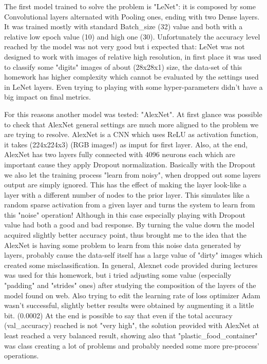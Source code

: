 \documentclass[11pt]{scrartcl}
\begin{document}
{{{\vspace{0.3cm}

\noindent
The first model trained to solve the problem is "LeNet": it is composed by some Convolutional layers alternated with Pooling ones, ending with two Dense layers.
It was trained mostly with standard Batch\_size (32) value and both with a relative low epoch value (10) and high one (30). \newline
Unfortunately the accuracy level reached by the model was not very good but i expected that: LeNet was not designed to work with images of relative high resolution, in first place it was used to classify some "digits" images of about (28x28x1) size, the data-set of this homework has higher complexity which cannot be evaluated by the settings used in LeNet layers. Even trying to playing with some hyper-parameters didn't have a big impact on final metrics.

\vspace{0.3cm}

\noindent
For this reasons another model was tested: "AlexNet". At first glance was possible to check that AlexNet general settings are much more aligned to the problem we are trying to resolve. AlexNet is a CNN which uses ReLU as activation function, it takes (224x224x3) (RGB images!) as imput for first layer. Also, at the end, AlexNet has two layers fully connected with 4096 neurons each which are important cause they apply Dropout normalization. Basically with the Dropout we also let the training process "learn from noisy", when dropped out some layers output are simply ignored. This has the effect of making the layer look-like a layer with a different number of nodes to the prior layer. This simulates like a random sparse activation from a given layer and turns the system to learn from this "noise" operation! \newline
Although in this case especially playing with Dropout value had both a good and bad response. By turning the value down the model acquired slightly better accuracy point, thus brought me to the idea that the AlexNet is having some problem to learn from this noise data generated by layers, probably cause the data-self itself has a large value of "dirty" images which created some misclassification.
In general, Alexnet code provided during lectures was used for this homework, but i tried adjusting some value (especially "padding" and "strides" ones) after studying the composition of the layers of the model found on web. Also trying to edit the learning rate of loss optimizer Adam wasn't successful, slightly better results were obtained by augmenting it a little bit. (0.0002)
\newline
At the end is possible to say that even if the total accuracy (val\_accuracy) reached is not "very high", the solution provided with AlexNet at least reached a very balanced result, showing also that "plastic\_food\_container" was class creating a lot of problems and probably needed some more pre-process' operations.

}}}
\end{document}
